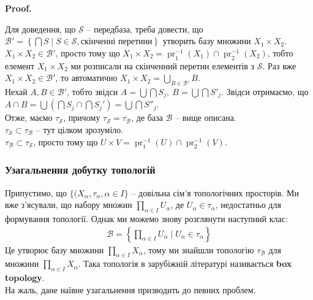 \documentclass[a4paper, 10pt]{article}
\makeatletter
\theoremstyle{theoremdd}
\DeclareMathOperator{\pr}{pr}
\renewenvironment{proof}[1][Proof.\\]{\par
\pushQED{\hfill \qed}%
\normalfont \topsep6\p@\@plus6\p@\relax
\trivlist
\item\relax
{\bfseries
#1\@addpunct{.}}\hspace\labelsep\ignorespaces
}{%
\popQED\endtrivlist\@endpefalse
}
\makeatother
\begin{document}
\begin{proof}
Для доведення, що $\mathcal{S}$ -- передбаза, треба довести, що $\mathcal{B}' = \left\{ \bigcap S \mid S \in \mathcal{S}, \text{скінченні перетини} \right\}$ утворить базу множини $X_1 \times X_2$.\\
$X_1 \times X_2 \in \mathcal{B}'$, просто тому що $X_1 \times X_2 = \pr_1^{-1}(X_1) \cap \pr_2^{-1}(X_2)$, тобто елемент $X_1 \times X_2$ ми розписали на скінченний перетин елементів з $\mathcal{S}$. Раз вже $X_1 \times X_2 \in \mathcal{B}'$, то автоматично $X_1 \times X_2 = \displaystyle\bigcup_{B \in \mathcal{B}'} B$.\\
Нехай $A,B \in \mathcal{B}'$, тобто звідси $A = \displaystyle\bigcup \bigcap S_j,\ B = \displaystyle\bigcup \bigcap S'_j$. Звідси отримаємо, що\\
$A \cap B = \displaystyle\bigcup \left( \bigcap S_j \cap \bigcap S_j' \right) = \bigcup \bigcap S''_j$.\\
Отже, маємо $\tau_{\mathcal{S}}$, причому $\tau_{\mathcal{S}} = \tau_{\mathcal{B}}$, де база $\mathcal{B}$ -- вище описана.\\
$\tau_{\mathcal{S}} \subset \tau_{\mathcal{B}}$ -- тут цілком зрозуміло.\\
$\tau_{\mathcal{B}} \subset \tau_{\mathcal{S}}$, просто тому що $U \times V = \pr_1^{-1}(U) \cap \pr_2^{-1}(V)$.
\end{proof}

\subsubsection*{Узагальнення добутку топологій}
Припустимо, що $\{(X_\alpha,\tau_\alpha, \alpha \in I \}$ -- довільна сім'я топологічних просторів. Ми вже з'ясували, що набору множин $\displaystyle\prod_{\alpha \in I} U_\alpha$, де $U_\alpha \in \tau_\alpha$, недостатньо для формування топології. Однак ми можемо знову розглянути наступний клас:
\begin{align*}
\mathcal{B} = \left\{ \prod_{\alpha \in I} U_\alpha \mid U_\alpha \in \tau_\alpha  \right\}
\end{align*}
Це утворює базу множини $\displaystyle\prod_{\alpha \in I} X_\alpha$, тому ми знайшли топологію $\tau_{\mathcal{B}}$ для множини $\displaystyle\prod_{\alpha \in I} X_\alpha$. Така топологія в зарубіжній літературі називається \textbf{box topology}.\\
На жаль, дане наївне узагальнення призводить до певних проблем.
\end{document}
